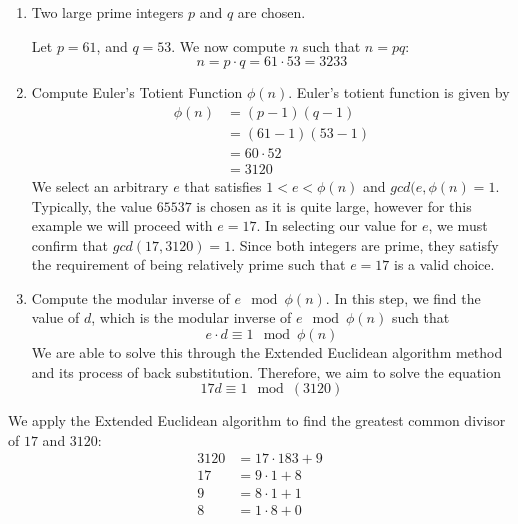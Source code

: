\documentclass{article}
\begin{document}
\begin{enumerate}
    \item Two large prime integers $p$ and $q$ are chosen.
    
Let $p = 61$, and $q = 53$. We now compute $n$ such that $n = pq$:
\begin{equation}
n = p \cdot q = 61 \cdot 53 = 3233
\end{equation}
\item Compute Euler's Totient Function $\phi(n)$.
Euler's totient function is given by
\begin{equation}
\begin{aligned}
\phi(n) &= (p - 1)(q - 1)\\
&= (61 - 1)(53 - 1)\\
&= 60 \cdot 52\\
&= 3120
\end{aligned}
\end{equation}
We select an arbitrary $e$ that satisfies $1 < e < \phi(n)$ and $gcd(e, \phi(n) = 1$. Typically, the value $65537$ is chosen as it is quite large, however for this example we will proceed with $e = 17$. In selecting our value for $e$, we must confirm that $gcd(17, 3120) = 1$. Since both integers are prime, they satisfy the requirement of being relatively prime such that $e = 17$ is a valid choice. 
\item Compute the modular inverse of $e \mod \phi(n)$.
In this step, we find the value of $d$, which is the modular inverse of $e \mod \phi(n)$ such that
\begin{equation}
e \cdot d \equiv 1 \mod \phi(n)
\end{equation}
We are able to solve this through the Extended Euclidean algorithm method and its process of back substitution. Therefore, we aim to solve the equation
\begin{equation}
17d \equiv 1 \mod(3120)
\end{equation}

\end{enumerate}
We apply the Extended Euclidean algorithm to find the greatest common divisor of $17$ and $3120$:
\begin{equation}
\begin{aligned}
3120 & = 17 \cdot 183 + 9 \\
17 & = 9 \cdot  1 + 8 \\
9 & = 8 \cdot 1 + 1 \\
8 & = 1 \cdot  8 + 0
\end{aligned}
\end{equation}
\end{document}
